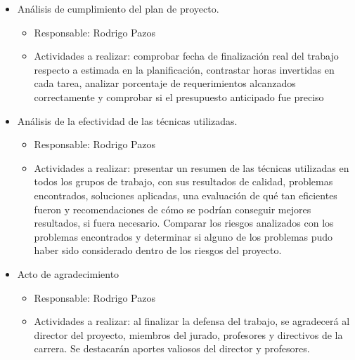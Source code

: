 \documentclass[
11pt, %
]{charter}
\begin{document}
\begin{itemize}
\item Análisis de cumplimiento del plan de proyecto.
\begin{itemize}
\item Responsable: Rodrigo Pazos
\item Actividades a realizar: comprobar fecha de finalización real del trabajo respecto
a estimada en la planificación, contrastar horas invertidas en cada tarea, analizar
porcentaje de requerimientos alcanzados correctamente y comprobar si el presupuesto
anticipado fue preciso
\end{itemize}
\item Análisis de la efectividad de las técnicas utilizadas.
\begin{itemize}
\item Responsable: Rodrigo Pazos
\item Actividades a realizar: presentar un resumen de las técnicas utilizadas en todos los grupos de trabajo, con sus resultados de calidad, problemas encontrados, soluciones aplicadas, una evaluación de qué tan eficientes fueron y recomendaciones de cómo se podrían conseguir mejores resultados, si fuera necesario. Comparar los riesgos analizados con los problemas encontrados y determinar si alguno de los problemas pudo haber sido considerado dentro de los riesgos del proyecto.
\end{itemize}
\item Acto de agradecimiento
\begin{itemize}
\item Responsable: Rodrigo Pazos
\item Actividades a realizar: al finalizar la defensa del trabajo, se agradecerá al director
del proyecto, miembros del jurado, profesores y directivos de la carrera. Se destacarán aportes valiosos del director y profesores. 
\end{itemize}
\end{itemize}
\end{document}
